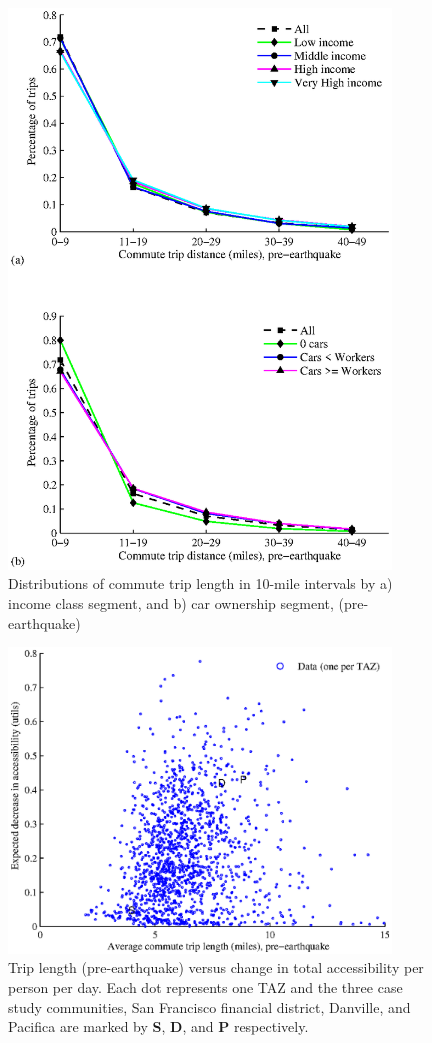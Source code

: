 \begin{figure}[h!]
\centering
\includegraphics[width=4in]{FIGS/equity_trip_distance_income_cars_to_and_from_work.eps} 
\caption{Distributions of commute trip length in 10-mile intervals  by a) income class segment, and b) car ownership segment,  (pre-earthquake)}
\label{fig:lengthIncomeBars}
\end{figure}

%
\begin{figure}[h!]
\centering
\includegraphics[width=4in]{FIGS/equity_accLength2.eps} 
\caption{Trip length (pre-earthquake) versus change in total accessibility per person per day. Each dot represents one TAZ and the three case study communities, San Francisco financial district, Danville, and Pacifica are marked by \textbf{S}, \textbf{D}, and \textbf{P} respectively.}
\label{fig:accLength}
\end{figure}



